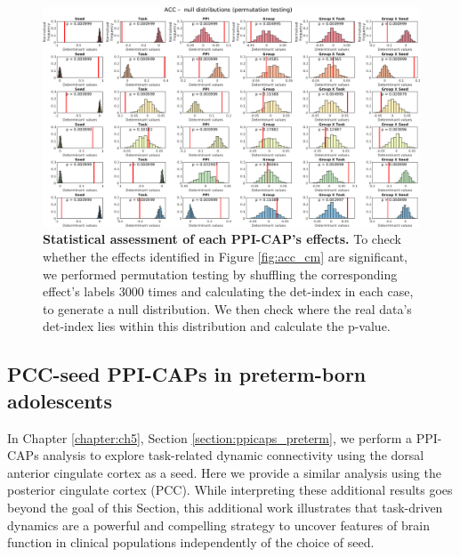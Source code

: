 \begin{figure}[h]
\centering
\includegraphics[width=1\textwidth]{images/Appendix/ACCK6_stats_permutation2.png}
\vspace{5mm}
\caption{\textbf{Statistical assessment of each PPI-CAP's effects.} To check whether the effects identified in Figure \ref{fig:acc_cm} are significant, we performed permutation testing by shuffling the corresponding effect's labels 3000 times and calculating the det-index in each case, to generate a null distribution. We then check where the real data's det-index lies within this distribution and calculate the p-value. }
\label{fig:app_acc_stats}
\end{figure}








\clearpage
\subsection*{PCC-seed PPI-CAPs in preterm-born adolescents} \label{sm_pcc_ppicaps}
 In Chapter \ref{chapter:ch5}, Section \ref{section:ppicaps_preterm}, we perform a PPI-CAPs analysis to explore task-related dynamic connectivity using the dorsal anterior cingulate cortex as a seed. Here we provide a similar analysis using the posterior cingulate cortex (PCC). While interpreting these additional results goes beyond the goal of this Section, this additional work illustrates that task-driven dynamics are a powerful and compelling strategy to uncover features of brain function in clinical populations independently of the choice of seed. 
\vspace{1cm}




